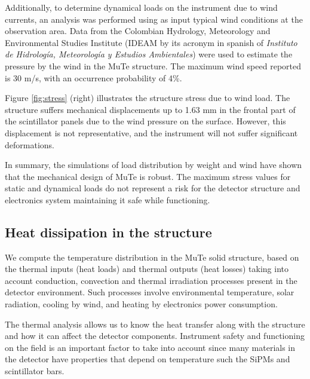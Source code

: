 \documentclass[letterpaper,11pt]{article}
\begin{document}
Additionally, to determine dynamical loads on the instrument due to wind currents, an analysis was performed using as input typical wind conditions at the observation area. Data from the Colombian Hydrology, Meteorology and Environmental Studies Institute (IDEAM by its acronym in spanish of \textit{Instituto de Hidrología, Meteorología y Estudios Ambientales}) were used to estimate the pressure by the wind in the MuTe structure. The maximum wind speed reported is 30 m/s, with an occurrence probability of 4\%.


Figure \ref{fig:stress} (right) illustrates the structure stress due to wind load. The structure suffers mechanical displacements up to 1.63 mm in the frontal part of the scintillator panels due to the wind pressure on the surface. However, this displacement is not representative, and the instrument will not suffer significant deformations.

In summary, the simulations of load distribution by weight and wind have shown that the mechanical design of MuTe is robust. The maximum stress values for static and dynamical loads do not represent a risk for the detector structure and electronics system maintaining it safe while functioning.

\subsection{Heat dissipation in the structure}

We compute the temperature distribution in the MuTe solid structure, based on the thermal inputs (heat loads) and thermal outputs (heat losses) taking into account conduction, convection and thermal irradiation processes present in the detector environment. Such processes involve environmental temperature, solar radiation, cooling by wind, and heating by electronics power consumption.

The thermal analysis allows us to know the heat transfer along with the structure and how it can affect the detector components. Instrument safety and functioning on the field is an important factor to take into account since many materials in the detector have properties that depend on temperature such the SiPMs and scintillator bars.
\end{document}
